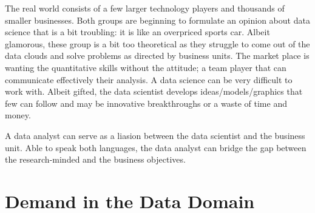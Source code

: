 \documentclass[]{article}
\begin{document}
The real world consists of a few larger technology players and thousands
of smaller businesses. Both groups are beginning to formulate an opinion
about data science that is a bit troubling: it is like an overpriced
sports car. Albeit glamorous, these group is a bit too theoretical as
they struggle to come out of the data clouds and solve problems as
directed by business units. The market place is wanting the quantitative
skills without the attitude; a team player that can communicate
effectively their analysis. A data science can be very difficult to work
with. Albeit gifted, the data scientist develops ideas/models/graphics
that few can follow and may be innovative breakthroughs or a waste of
time and money.

A data analyst can serve as a liasion between the data scientist and the
business unit. Able to speak both languages, the data analyst can bridge
the gap between the research-minded and the business objectives.

\newpage
\section{ Demand in the Data Domain}
\label{sec:ddd}
\end{document}
